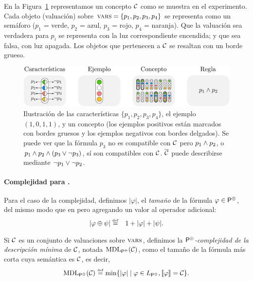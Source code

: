 En la Figura~\ref{semaforos} representamos un concepto $\mathcal{C}$ como se muestra en el experimento. Cada objeto (valuación) sobre $\textsc{vars}=\{p_1,p_2,p_3,p_4\}$ se representa como un semáforo ($p_1$ = verde, $p_2$ = azul, $p_3$ = rojo, $p_4$ = naranja). Que la valuación sea verdadera para $p_i$ se representa con la luz correspondiente encendida; y que sea falsa, con luz apagada. Los objetos que pertenecen a $\mathcal{C}$ se resaltan con un borde grueso. 

\begin{figure}[h]
\includegraphics[scale=.6]{../figuras/pre/notacion.pdf}
\caption{Ilustración de las características $\{p_1,p_2,p_3,p_4\}$, el ejemplo $(1,0,1,1)$, y un concepto (los ejemplos positivos están marcados con bordes gruesos y los ejemplos negativos con bordes delgados). Se puede ver que la fórmula $p_3$ no es compatible con $\mathcal{C}$ pero $p_1 \wedge p_2$, o $p_1 \wedge p_2 \wedge (p_3 \vee \lnot p_3)$, sí son compatibles con $\mathcal{C}$. $\overline {\mathcal{C}}$ puede describirse mediante $\lnot p_1\vee \lnot p_2$.}\label{semaforos}
\end{figure}


\paragraph{Complejidad para \gramboolxor.} Para el caso de la complejidad, definimos $|\varphi|$, el {\em tamaño} de la fórmula $\varphi\in{\sf P}^\oplus$, del mismo modo que en \grambool pero agregando un valor al operador adicional:
\begin{eqnarray*}
|\varphi\oplus\psi| &\stackrel{\scriptscriptstyle \mathrm{def}}{=}& 1+|\varphi|+|\psi|.
\end{eqnarray*}


Si $\mathcal{C}$ es un conjunto de valuaciones sobre $\textsc{vars}$, definimos la {\em ${\sf P}^\oplus$-complejidad de la descripción mínima} de $\mathcal{C}$, notada ${\rm MDL}_{{\sf P}^\oplus}(\mathcal{C})$, como el tamaño de la fórmula más corta cuya semántica es $\mathcal{C}$, es decir,
$$
{\rm MDL}_{{\sf P}^\oplus}(\mathcal{C})\stackrel{\scriptscriptstyle \mathrm{def}}{=}\min\{|\varphi|\mid \varphi\in L_{{\sf P}^\oplus},\llbracket \varphi\rrbracket=\mathcal{C}\}.
$$

